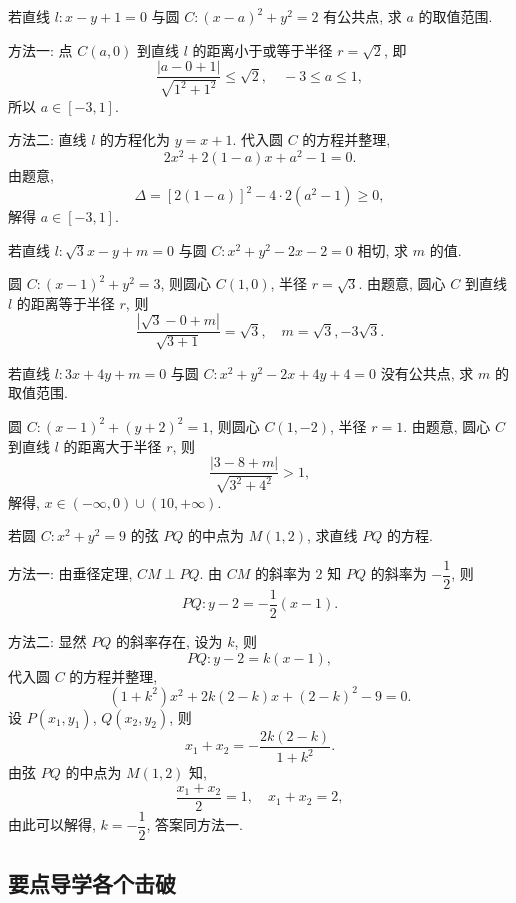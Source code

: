 \begin{exercise}
    若直线 $l\colon x-y+1=0$ 与圆 $C\colon (x-a)^2 +y^2 =2$ 有公共点, 求 $a$ 的取值范围.
\end{exercise}
\beginsolution
    方法一: 点 $C(a,0)$ 到直线 $l$ 的距离小于或等于半径 $r=\sqrt2$, 即
    \[\frac{|a-0+1|}{\sqrt{1^2+1^2}}\leqslant \sqrt{2},\quad
    -3\leqslant a\leqslant 1,\]
    所以 $a\in[-3,1]$.

    方法二: 直线 $l$ 的方程化为 $y= x+1$. 代入圆 $C$ 的方程并整理,
    \[2x^2+ 2(1-a)x+ a^2-1= 0.\]
    由题意,
    \[\Delta= [2(1-a)]^2- 4\cdot 2(a^2-1)\geqslant 0,\]
    解得 $a\in[-3,1]$.
\endsolution

\begin{exercise}
    若直线 $l\colon \sqrt3 x-y+m=0$ 与圆 $C\colon x^2 +y^2 -2x-2=0$ 相切, 求 $m$ 的值.
\end{exercise}
\beginsolution
    圆 $C\colon (x-1)^2+y^2= 3$, 则圆心 $C(1,0)$, 半径 $r=\sqrt3$. 由题意, 圆心 $C$ 到直线 $l$ 的距离等于半径 $r$, 则
    \[\frac{|\sqrt3-0+m|}{\sqrt{3+1}}= \sqrt3,\quad
    m= \sqrt3,-3\sqrt3.\]
\endsolution

\begin{exercise}
    若直线 $l\colon 3x+4y+m=0$ 与圆 $C\colon x^2+y^2-2x+4y+4=0$ 没有公共点, 求 $m$ 的取值范围.
\end{exercise}
\beginsolution
    圆 $C\colon (x-1)^2+(y+2)^2= 1$, 则圆心 $C(1,-2)$, 半径 $r=1$. 由题意, 圆心 $C$ 到直线 $l$ 的距离大于半径 $r$, 则
    \[\frac{|3-8+m|}{\sqrt{3^2+4^2}}>1,\]
    解得, $x\in (-\infty,0)\cup (10,+\infty)$.
\endsolution

\begin{exercise}
    若圆 $C\colon x^2 +y^2 =9$ 的弦 $PQ$ 的中点为 $M(1,2)$, 求直线 $PQ$ 的方程.
\end{exercise}
\beginsolution
    方法一: 由垂径定理, $CM\perp PQ$. 由 $CM$ 的斜率为 $2$ 知 $PQ$ 的斜率为 $-\dfrac12$, 则
    \[PQ\colon y-2= -\frac12(x-1).\]

    方法二: 显然 $PQ$ 的斜率存在, 设为 $k$, 则
    \[PQ\colon y-2= k(x-1),\]
    代入圆 $C$ 的方程并整理,
    \[(1+k^2)x^2+ 2k(2-k)x+ (2-k)^2-9= 0.\]
    设 $P(x_1,y_1)$, $Q(x_2,y_2)$, 则
    \[x_1+x_2= -\frac{2k(2-k)}{1+k^2}.\]
    由弦 $PQ$ 的中点为 $M(1,2)$ 知,
    \[\frac{x_1+x_2}{2}= 1,\quad x_1+x_2= 2,\]
    由此可以解得, $k= -\dfrac12$, 答案同方法一.
\endsolution

\subsection{要点导学\quad 各个击破}
